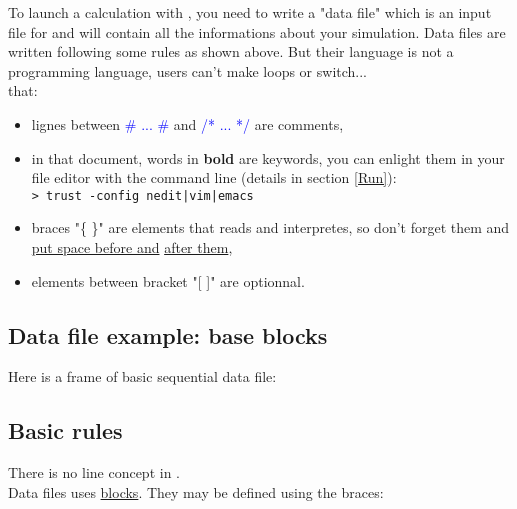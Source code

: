 To launch a calculation with \trust, you need to write a "data file" which is an input file for \trust and will contain all the informations about your simulation.
Data files are written following some rules as shown above. But their language is not a programming language, users can't make loops or switch...\\

\Note that:
\begin{itemize}
\item lignes between \textcolor{blue}{\# ... \#} and \textcolor{blue}{/* ... */} are comments,
\item in that document, words in \textbf{bold} are \trust keywords, you can enlight them in your file editor with the command line (details in section \ref{Run}):\\
\texttt{> trust -config nedit|vim|emacs}
\item braces "\{ \}" are elements that \trust reads and interpretes, so don't forget them and \underline{put space before and} \underline{after them},
\item elements between bracket "[ ]" are optionnal.
\end{itemize}

\subsection{Data file example: base blocks} \label{data}
Here is a frame of basic sequential data file:\\






\subsection{Basic rules}
There is no line concept in \trust.\\

Data files uses \underline{blocks}. They may be defined using the braces:\\
    \begin{center}
    \end{center}
\bigskip{}


